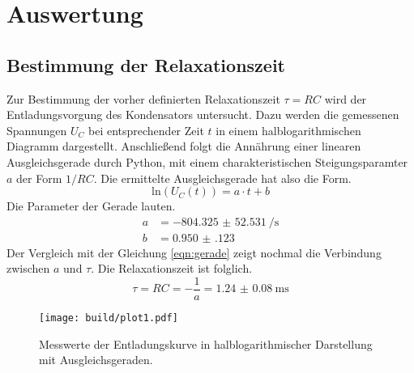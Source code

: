 \section{Auswertung}
\subsection{Bestimmung der Relaxationszeit}  %
Zur Bestimmung der vorher definierten Relaxationszeit $\tau = RC$ wird der Entladungsvorgung des Kondensators untersucht.
Dazu werden die gemessenen Spannungen $U_{C}$ bei entsprechender Zeit $t$ in einem halblogarithmischen Diagramm dargestellt.
Anschließend folgt die Annährung einer linearen Ausgleichsgerade durch Python, mit einem charakteristischen Steigungsparamter $a$
der Form $1/RC$. 
Die ermittelte Ausgleichsgerade hat also die Form.
\begin{equation}
    \text{ln}(U_{C}(t)) = a \cdot t + b
\end{equation}
Die Parameter der Gerade lauten.
 \begin{align*}
     a &= \SI{-804.325(52531)}{\si{\per\second}} \\
     b &= \SI{0.950(123)}{}
 \end{align*}
Der Vergleich mit der Gleichung \eqref{eqn:gerade} zeigt nochmal die Verbindung zwischen $a$ und $\tau$. Die Relaxationszeit ist folglich.
\begin{equation}
\tau = RC = - \frac{1}{a} = \SI{1.24(8)}{\milli\second}
\end{equation}
 
\begin{figure}
    \centering 
    \texttt{[image: build/plot1.pdf]}
    \caption{Messwerte der Entladungskurve in halblogarithmischer Darstellung mit Ausgleichsgeraden.}
    \label{plt:plot1}
\end{figure} 
